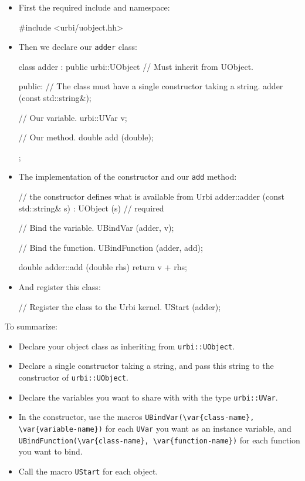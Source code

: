 \begin{itemize}
\item First the required include and namespace:

\begin{cxx}
#include <urbi/uobject.hh>
\end{cxx}

\item Then we declare our \lstinline{adder} class:
\begin{cxx}
class adder : public urbi::UObject // Must inherit from UObject.
{
  public:
   // The class must have a single constructor taking a string.
   adder (const std::string&);

   // Our variable.
   urbi::UVar v;

   // Our method.
   double add (double);
};
\end{cxx}
\item The implementation of the constructor and our \lstinline{add}
  method:
\begin{cxx}
// the constructor defines what is available from Urbi
adder::adder (const std::string& s)
  : UObject (s) // required
{
  // Bind the variable.
  UBindVar (adder, v);

  // Bind the function.
  UBindFunction (adder, add);
}

double
adder::add (double rhs)
{
  return v + rhs;
}
\end{cxx}
\item And register this class:
\begin{cxx}
// Register the class to the Urbi kernel.
UStart (adder);
\end{cxx}
\end{itemize}

To summarize:

\begin{itemize}
\item Declare your object class as inheriting from
  \lstinline{urbi::UObject}.
\item Declare a single constructor taking a string, and pass this
  string to the constructor of \lstinline{urbi::UObject}.
\item Declare the variables you want to share with \urbi with the type
  \lstinline{urbi::UVar}.
\item In the constructor, use the macros
  \lstinline|UBindVar(\var{class-name}, \var{variable-name})|
  for each \lstinline{UVar} you want as an instance variable, and
  \lstinline|UBindFunction(\var{class-name}, \var{function-name})| for
  each function you want to bind.
\item Call the macro \lstinline{UStart} for each object.
\end{itemize}

